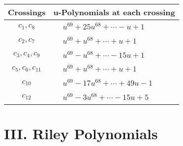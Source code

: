 \documentclass[1p]{elsarticle_modified}
\theoremstyle{definition}
\begin{document}
\begin{tabular}{m{50pt}|m{274pt}}
Crossings & \hspace{64pt}u-Polynomials at each crossing \\
\hline $$\begin{aligned}c_{1},c_{8}\end{aligned}$$&$\begin{aligned}
&u^{69}+25 u^{68}+\cdots- u+1
\end{aligned}$\\
\hline $$\begin{aligned}c_{2},c_{7}\end{aligned}$$&$\begin{aligned}
&u^{69}+u^{68}+\cdots+u+1
\end{aligned}$\\
\hline $$\begin{aligned}c_{3},c_{4},c_{9}\end{aligned}$$&$\begin{aligned}
&u^{69}- u^{68}+\cdots-15 u+1
\end{aligned}$\\
\hline $$\begin{aligned}c_{5},c_{6},c_{11}\end{aligned}$$&$\begin{aligned}
&u^{69}+u^{68}+\cdots+u+1
\end{aligned}$\\
\hline $$\begin{aligned}c_{10}\end{aligned}$$&$\begin{aligned}
&u^{69}-17 u^{68}+\cdots+49 u-1
\end{aligned}$\\
\hline $$\begin{aligned}c_{12}\end{aligned}$$&$\begin{aligned}
&u^{69}-3 u^{68}+\cdots-15 u+5
\end{aligned}$\\
\hline
\end{tabular}\newpage\renewcommand{\arraystretch}{1}
\centering \section*{ III. Riley Polynomials}
\end{document}
